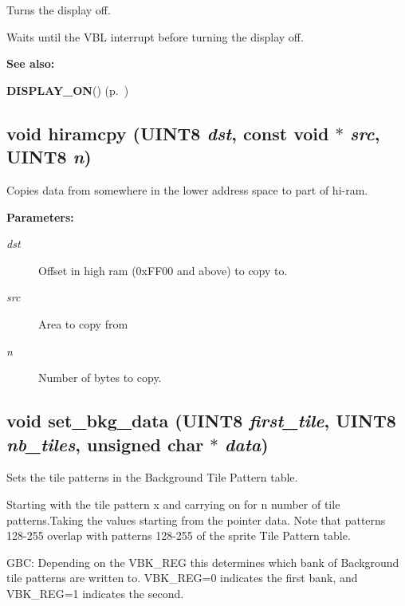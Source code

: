 Turns the display off.

Waits until the VBL interrupt before turning the display off. \begin{Desc}
\item[{\bf See also: }]\par
{\bf DISPLAY\_\-ON}() {\rm (p.~\pageref{gb.h_a43})} \end{Desc}
\label{gb.h_a77}
\subsection{\setlength{\rightskip}{0pt plus 5cm}void hiramcpy ({\bf UINT8} {\em dst}, const void $\ast$ {\em src}, {\bf UINT8} {\em n})}

Copies data from somewhere in the lower address space to part of hi-ram.

\begin{Desc}
\item[{\bf Parameters: }]\par
\begin{description}
\item[
{\em dst}] Offset in high ram (0x\-FF00 and above) to copy to. \item[
{\em src}] Area to copy from \item[
{\em n}] Number of bytes to copy. \end{description}
\end{Desc}
\label{gb.h_a78}
\subsection{\setlength{\rightskip}{0pt plus 5cm}void set\_\-bkg\_\-data ({\bf UINT8} {\em first\_\-tile}, {\bf UINT8} {\em nb\_\-tiles}, unsigned char $\ast$ {\em data})}

Sets the tile patterns in the Background Tile Pattern table.

Starting with the tile pattern x and carrying on for n number of tile patterns.Taking the values starting from the pointer data. Note that patterns 128-255 overlap with patterns 128-255 of the sprite Tile Pattern table.

GBC: Depending on the VBK\_\-REG this determines which bank of Background tile patterns are written to. VBK\_\-REG=0 indicates the first bank, and VBK\_\-REG=1 indicates the second.

